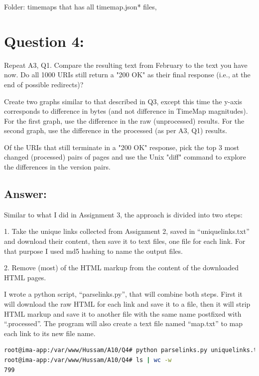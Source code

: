 \documentclass[a4paper, 11pt]{article}
\begin{document}
\noindent 
Folder: timemaps that has all timemap.json* files, 


\section*{Question 4:}

Repeat A3, Q1.  Compare the resulting text from February to 
the text you have now.  Do all 1000 URIs still return a "200 OK" 
as their final response (i.e., at the end of possible redirects)?

Create two graphs similar to that described in Q3, except this 
time the y-axis corresponds to difference in bytes (and not difference
in TimeMap magnitudes).  For the first graph, use the difference
in the raw (unprocessed) results.  For the second graph, use the 
difference in the processed (as per A3, Q1) results.

Of the URIs that still terminate in a "200 OK" response, pick the
top 3 most changed (processed) pairs of pages and use the Unix
"diff" command to explore the differences in the version pairs.

\subsection*{Answer:}

Similar to what I did in Assignment 3, the approach is divided into two steps:

1. Take the unique links collected from Assignment 2, saved in ``uniquelinks.txt'' and download their content, then save it to text files, one file for each link. For that purpose I used md5 hashing to name the output files.

2. Remove (most) of the HTML markup from the content of the downloaded HTML pages.

I wrote a python script, ``parselinks.py'', that will combine both steps. First it will download the raw HTML for each link and save it to a file, then it will strip HTML markup and save it to another file with the same name postfixed with ``.processed''. The program will also create a text file named ``map.txt'' to map each link to its new file name.



\begin{lstlisting}[language=bash, breakatwhitespace=〈false), label=running parselinks.py, caption= Running parselinks.py to download raw HTML and visible text from URIs]
root@ima-app:/var/www/Hussam/A10/Q4# python parselinks.py uniquelinks.txt
root@ima-app:/var/www/Hussam/A10/Q4# ls | wc -w
799
\end{lstlisting}
\end{document}
